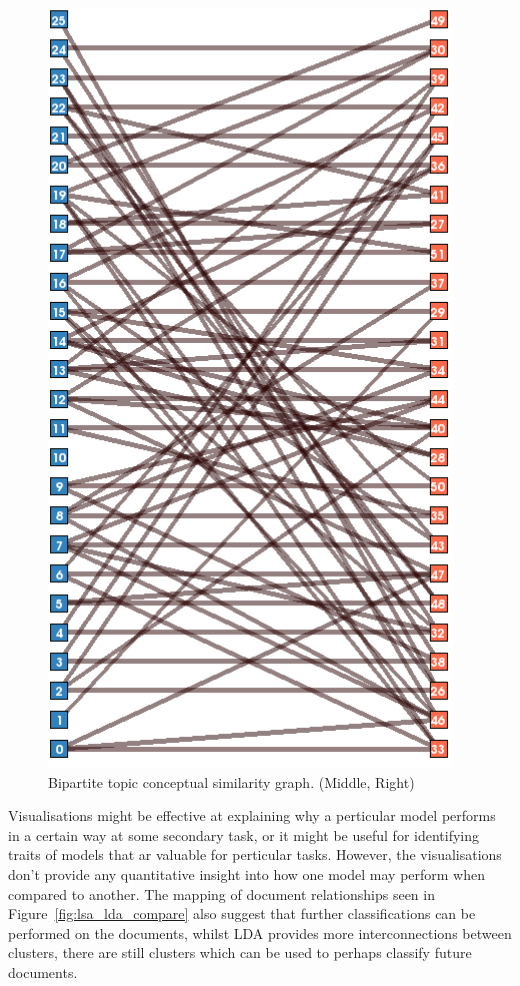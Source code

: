 \documentclass[10pt]{report}
\begin{document}
\begin{figure}
  \vspace{0.3cm}
  \centering
    \includegraphics[scale=0.35]{lda_lsa_topic_view}
\caption{Bipartite topic conceptual similarity graph. (Middle, Right)  \label{fig:topic_modelling_comparisons}}
\end{figure}


Visualisations might be effective at explaining why a perticular model performs in a certain way at some secondary task, or it might be useful for identifying traits of models that ar valuable for perticular tasks. However, the visualisations don't provide any quantitative insight into how one model may perform when compared to another. The mapping of document relationships seen in Figure~\ref{fig:lsa_lda_compare} also suggest that further classifications can be performed on the documents, whilst LDA provides more interconnections between clusters, there are still clusters which can be used to perhaps classify future documents.
\end{document}
